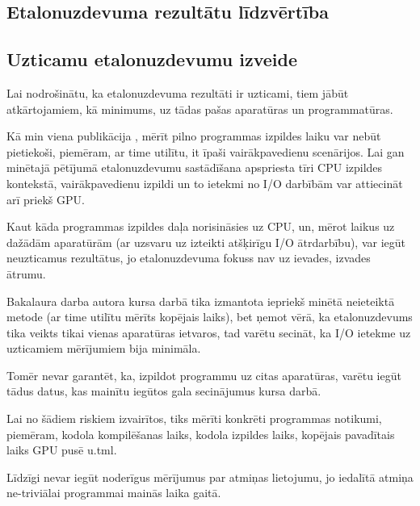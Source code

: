 \documentclass[12pt]{report}%
\theoremstyle{definition}
\begin{document}








\begin{center}
    \chapter{Etalonuzdevuma rezultātu līdzvērtība}
\end{center}


\section{Uzticamu etalonuzdevumu izveide}

Lai nodrošinātu, ka etalonuzdevuma rezultāti ir uzticami, tiem jābūt
atkārtojamiem, kā minimums, uz tādas pašas aparatūras un programmatūras.
\cite{reliable-benchmarking}



Kā min viena publikācija \cite{reliable-benchmarking}, mērīt pilno programmas
izpildes laiku var nebūt pietiekoši, piemēram, ar time utilītu, it īpaši
vairākpavedienu scenārijos. Lai gan minētajā pētījumā etalonuzdevumu
sastādīšana apspriesta tīri CPU izpildes kontekstā, vairākpavedienu izpildi un
to ietekmi no I/O darbībām var attiecināt arī priekš GPU.

Kaut kāda programmas izpildes daļa norisināsies uz CPU, un, mērot laikus uz
dažādām aparatūrām (ar uzsvaru uz izteikti atšķirīgu I/O ātrdarbību), var iegūt
neuzticamus rezultātus, jo etalonuzdevuma fokuss nav uz ievades, izvades
ātrumu.

Bakalaura darba autora kursa darbā\cite{kursa-darbs} tika izmantota iepriekš
minētā neieteiktā metode (ar time utilītu mērīts kopējais laiks), bet ņemot
vērā, ka etalonuzdevums tika veikts tikai vienas aparatūras ietvaros, tad
varētu secināt, ka I/O ietekme uz uzticamiem mērījumiem bija minimāla.

Tomēr nevar garantēt, ka, izpildot programmu uz citas aparatūras, varētu iegūt
tādus datus, kas mainītu iegūtos gala secinājumus kursa darbā.

Lai no šādiem riskiem izvairītos, tiks mērīti konkrēti programmas notikumi,
piemēram, kodola kompilēšanas laiks, kodola izpildes laiks, kopējais pavadītais
laiks GPU pusē u.tml.


Līdzīgi nevar iegūt noderīgus mērījumus par atmiņas lietojumu, jo iedalītā atmiņa ne-triviālai programmai mainās laika gaitā.
\end{document}
